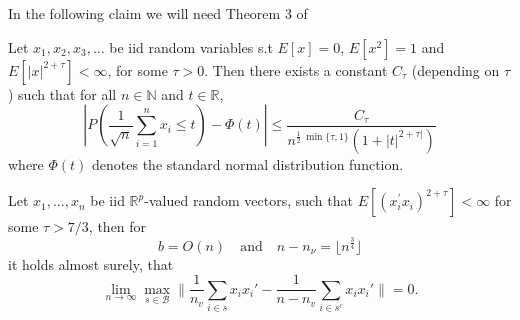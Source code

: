 \documentclass[Research_Module_ES.tex]{subfiles}
\begin{document}
In the following claim we will need Theorem 3 of \cite{michel1976nonuniform}
\begin{thm}\label{Michel76Thm3}
Let $x_1,x_2,x_3,\ldots$ be iid random variables s.t $E[x]=0$, $E[x^2]=1$ and $E[|x|^{2+\tau}]<\infty$, for some $\tau>0$. Then there exists a constant $C_\tau$ (depending on $\tau$) such that for all $n\in \mathbb{N}$ and $t\in\mathbb{R}$,
\[
	\left| P\left( \frac{1}{\sqrt{n}}\sum_{i=1}^{n}x_i\leq t \right) -\Phi(t) \right| \leq \frac{C_\tau}{n^{\frac{1}{2}~ \min\{\tau,1\}} (1+|t|^{2+\tau|}) }
\] 
where $\Phi (t)$ denotes the standard normal distribution function.
\end{thm}	
	
\begin{claim}
Let $x_1,\ldots,x_n$ be iid $\mathbb{R}^p$-valued random vectors, such that $E[(x^\prime_i x_i)^{2+\tau}]<\infty$ for some $\tau>7/3$, then for 
\[
	b=O(n)\quad\textrm{and}\quad n-n_\nu=\lfloor n^{\frac{3}{4}}\rfloor
\]
it holds almost surely, that
\[
\lim_{n\to\infty} \max_{s\in \mathcal{B}}\biggl\lVert \frac{1}{n_v}\sum_{i\in s}x_ix_i' - \frac{1}{n-n_v}\sum_{i\in s^c}x_ix_i'\biggr\rVert =0. \label{gram_matrix_condition_BICV}
\]
\end{claim}
\end{document}
